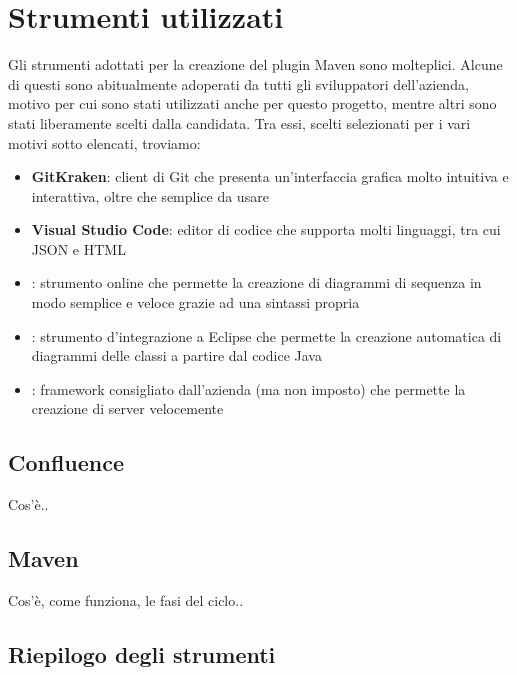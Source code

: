 \section{Strumenti utilizzati}
Gli strumenti adottati per la creazione del plugin Maven sono molteplici.
Alcune di questi sono abitualmente adoperati da tutti gli sviluppatori dell'azienda, motivo per cui sono stati utilizzati anche per questo progetto, mentre altri sono stati liberamente scelti dalla candidata.
Tra essi, scelti selezionati per i vari motivi sotto elencati, troviamo:
\begin{itemize}
    \item \textbf{GitKraken}: client di Git che presenta un'interfaccia grafica molto intuitiva e interattiva, oltre che semplice da usare
    \item \textbf{Visual Studio Code}: editor di codice che supporta molti linguaggi, tra cui JSON e HTML
    \item {}: strumento online che permette la creazione di diagrammi di sequenza in modo semplice e veloce grazie ad una sintassi propria
    \item {}: strumento d'integrazione a Eclipse che permette la creazione automatica di diagrammi delle classi a partire dal codice Java
    \item {}: framework consigliato dall'azienda (ma non imposto) che permette la creazione di server velocemente
\end{itemize}

    \subsection{Confluence}
    Cos'è..

    \subsection{Maven}
    Cos'è, come funziona, le fasi del ciclo..

    \subsection{Riepilogo degli strumenti}

